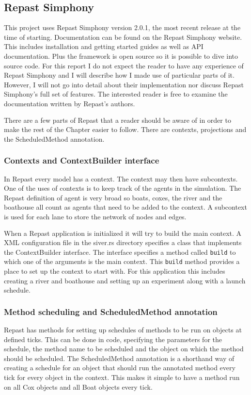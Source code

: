   \subsection{Repast Simphony}
  This project uses Repast Simphony version 2.0.1, the most recent
  release at the time of starting. Documentation can be found on the
  Repast Simphony website. This includes installation and getting
  started guides as well as API documentation. Plus the framework is
  open source so it is possible to dive into source code. For this
  report I do not
  expect the reader to have any experience of Repast Simphony and I
  will describe how I made use of
  particular parts of it. However, I will not go into detail about
  their implementation nor discuss Repast Simphony's full set of
  features. The interested reader is free to
  examine the documentation written by Repast's authors.
  
  There are a few parts of Repast that a reader should be aware of in
  order to make the rest of the Chapter easier to follow. There are contexts, projections and the
  ScheduledMethod annotation. 

  \subsubsection{Contexts and ContextBuilder interface}
  In Repast every model has a context. The context may then have
  subcontexts. One of the uses of contexts is to keep track of the
  agents in the simulation. The Repast definition of agent is very
  broad so boats, coxes, the river and the boathouse all count as
  agents that need to be added to the context. A subcontext is used
  for each lane to store the network of nodes and edges.

  When a Repast application is initialized it will try to build the
  main context. A XML configuration file in the siver.rs directory
  specifies a class that implements the ContextBuilder interface. The
  interface specifies a method called \texttt{build} to which one of the
  arguments is the main context. This \texttt{build} method provides a
  place to set up the context to start with. For this application this
  includes creating a river and boathouse  and setting up an
  experiment along with a launch schedule.

  \subsubsection{Method scheduling and ScheduledMethod annotation}
  Repast has methods for setting up schedules of methods to be run on
  objects at defined ticks. This can be done in code, specifying the
  parameters for the schedule, the method name to be scheduled and the
  object on which the method should be scheduled. The ScheduledMethod annotation is a
  shorthand way of creating a schedule for an object that should run
  the annotated method every tick for every object in the
  context. This makes it simple to have a method run on all Cox
  objects and all Boat objects every tick.


